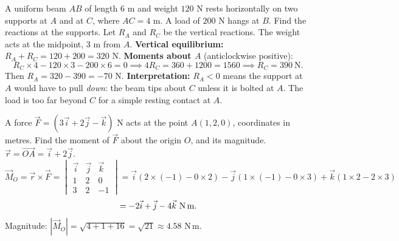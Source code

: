 \documentclass[11pt]{article}
\newcommand{\legende}[1]{\par\vspace{6pt}{\popsemi\fontsize{9}{11.5}\selectfont\color{popmuted}#1}}
\begin{document}
\begin{exoresolu}
A uniform beam $AB$ of length $6$ m and weight $120$ N rests horizontally on two supports at $A$ and at $C$, where $AC = 4$ m. A load of $200$ N hangs at $B$. Find the reactions at the supports.
\tcblower
Let $R_A$ and $R_C$ be the vertical reactions. The weight acts at the midpoint, $3$ m from $A$.
\textbf{Vertical equilibrium:} $R_A + R_C = 120 + 200 = 320$ N.
\textbf{Moments about $A$} (anticlockwise positive):
\[
R_C \times 4 - 120 \times 3 - 200 \times 6 = 0 \implies 4R_C = 360 + 1200 = 1560 \implies R_C = 390\ \text{N}.
\]
Then $R_A = 320 - 390 = -70$ N.
\textbf{Interpretation:} $R_A < 0$ means the support at $A$ would have to pull \emph{down}: the beam tips about $C$ unless it is bolted at $A$. The load is too far beyond $C$ for a simple resting contact at $A$.
\end{exoresolu}

\begin{popfigure}
\legende{Moment $\vec{M}_O = \vec{r}\times\vec{F}$ about the origin.}
\end{popfigure}

\begin{exoresolu}
A force $\vec{F} = (3\vec{i} + 2\vec{j} - \vec{k})$ N acts at the point $A(1, 2, 0)$, coordinates in metres. Find the moment of $\vec{F}$ about the origin $O$, and its magnitude.
\tcblower
$\vec{r} = \overrightarrow{OA} = \vec{i} + 2\vec{j}$.
\[
\vec{M}_O = \vec{r}\times\vec{F} = \begin{vmatrix} \vec{i} & \vec{j} & \vec{k} \\ 1 & 2 & 0 \\ 3 & 2 & -1 \end{vmatrix} = \vec{i}(2\times(-1) - 0\times 2) - \vec{j}(1\times(-1) - 0\times 3) + \vec{k}(1\times 2 - 2\times 3)
\]
\[
= -2\vec{i} + \vec{j} - 4\vec{k}\ \text{N\,m}.
\]
Magnitude: $|\vec{M}_O| = \sqrt{4 + 1 + 16} = \sqrt{21} \approx 4.58$ N\,m.
\end{exoresolu}
\end{document}
